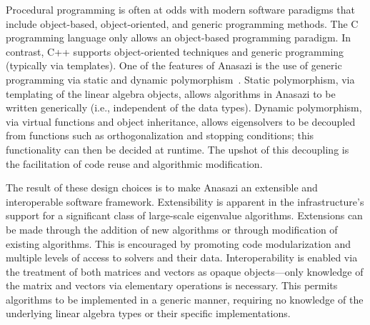 \documentclass[acmtoms]{acmtrans2m}
\newcounter{algorithm}
\begin{document}
Procedural programming is often at odds with modern software
paradigms that include object-based, object-oriented, and generic
programming methods. The C programming language only allows an
object-based programming paradigm. In contrast, C++ supports
object-oriented techniques and generic programming (typically via
templates). One of the features of Anasazi is the use of generic
programming via static and dynamic polymorphism~\cite[Chapter
14]{VJ02}. Static polymorphism, via templating of the linear algebra
objects, allows algorithms in Anasazi to be written generically
(i.e., independent of the data types). Dynamic polymorphism, via virtual
functions and object inheritance, allows eigensolvers to be
decoupled from functions such as orthogonalization and stopping
conditions; this functionality can then be decided at runtime. The
upshot of this decoupling is the facilitation of code reuse and
algorithmic modification.



The result of these design choices is to make Anasazi an extensible
and interoperable software framework. Extensibility is apparent in the
infrastructure's support for a significant class of large-scale
eigenvalue algorithms. Extensions can be made through the addition of
new algorithms or through modification of existing algorithms. This is
encouraged by promoting code modularization and multiple levels of
access to solvers and their data. Interoperability is enabled via the
treatment of both matrices and vectors as opaque objects---only
knowledge of the matrix and vectors via elementary operations is
necessary. This permits algorithms to be implemented in a generic
manner, requiring no knowledge of the underlying linear algebra types
or their specific implementations.
\end{document}
